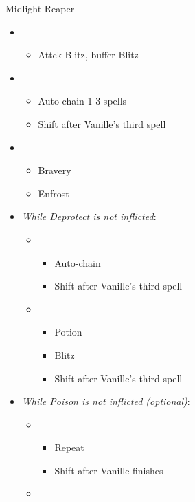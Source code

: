 \begin{multicols}{2}
\begin{battle}{Midlight Reaper}
\begin{itemize}
    \item \first
    \begin{itemize}
        \item Attck-Blitz, buffer Blitz
    \end{itemize}
    \item \fifth
    \begin{itemize}
        \item Auto-chain 1-3 spells
        \item Shift after Vanille's third spell
    \end{itemize}
    \item \third
    \begin{itemize}
        \item Bravery
        \item Enfrost
    \end{itemize}
    \item \textit{While Deprotect is not inflicted}:
    \begin{itemize}
    \item \fifth
    \begin{itemize}
        \item Auto-chain
        \item Shift after Vanille's third spell
    \end{itemize}
    \item \sixth
    \begin{itemize}
        \item Potion
        \item Blitz
        \item Shift after Vanille's third spell
    \end{itemize}
    \end{itemize}
    \item \textit{While Poison is not inflicted (optional)}:
    \begin{itemize}
        \item \first
        \begin{itemize}
            \item Repeat
            \item Shift after Vanille finishes
        \end{itemize}
        \item \sixth
        \begin{itemize}

\end{itemize}
\end{itemize}
\end{itemize}
\end{battle}
\end{multicols}

